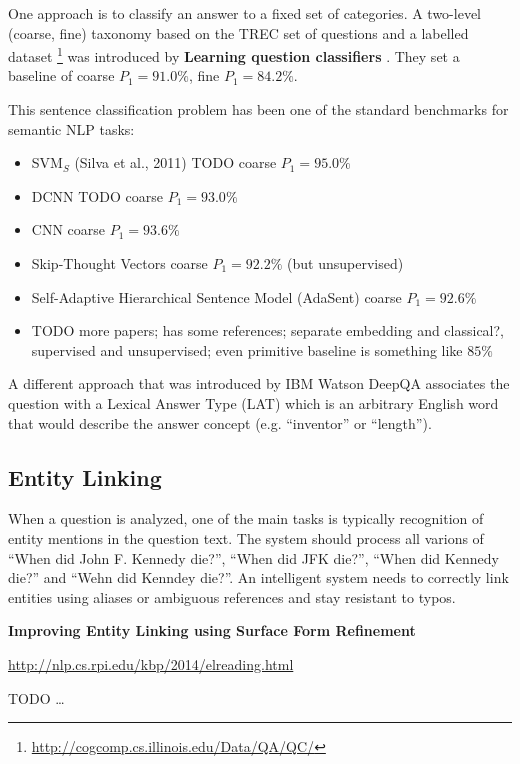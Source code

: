 One approach is to classify an answer to a fixed set of categories.
A two-level (coarse, fine) taxonomy based on the TREC set of questions and a labelled dataset%
\footnote{\url{http://cogcomp.cs.illinois.edu/Data/QA/QC/}}
was introduced by \textbf{Learning question classifiers} \cite{QCLearning}.
They set a baseline of coarse $P_1=91.0\%$, fine $P_1=84.2\%$.

This sentence classification problem has been one of the standard benchmarks
for semantic NLP tasks:
\begin{itemize}
	\item SVM$_S$ (Silva et al., 2011) TODO coarse $P_1=95.0\%$
	\item DCNN \cite{QtcDCNN} TODO coarse $P_1=93.0\%$
	\item CNN \cite{CNNSentClass} coarse $P_1=93.6\%$
	\item Skip-Thought Vectors \cite{SkipThought} coarse $P_1=92.2\%$ (but unsupervised)
	\item Self-Adaptive Hierarchical Sentence Model \cite{AdaSent} (AdaSent) coarse $P_1=92.6\%$
	\item TODO more papers; \cite{AdaSent} has some references; separate embedding and classical?, supervised and unsupervised; even primitive baseline is something like $85\%$
\end{itemize}

A different approach that was introduced by IBM Watson DeepQA \cite{WatsonTyCor}
associates the question with a Lexical Answer Type (LAT) which is
an arbitrary English word that would describe the answer concept
(e.g. ``inventor'' or ``length'').

\subsection{Entity Linking}

When a question is analyzed, one of the main tasks is typically recognition
of entity mentions in the question text.  The system should process all
varions of ``When did John F. Kennedy die?'', ``When did JFK die?'',
``When did Kennedy die?'' and ``Wehn did Kenndey die?''.  An intelligent
system needs to correctly link entities using aliases or ambiguous
references and stay resistant to typos.

\textbf{Improving Entity Linking using Surface Form Refinement}

\url{http://nlp.cs.rpi.edu/kbp/2014/elreading.html}

TODO \dots

